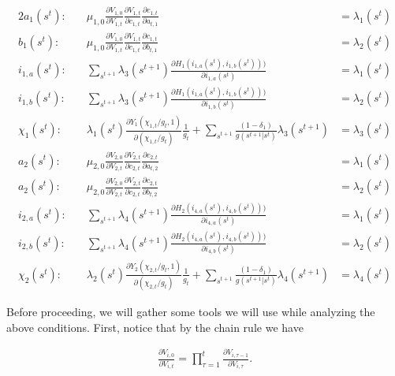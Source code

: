\documentclass[19pt]{article}
\newcommand{\fracpd}[2]{
  \ensuremath{\frac{\partial #1}{\partial #2}}
}
\begin{document}
\begin{alignat}{2}
  a_{1}(s^t)   : \quad & \mu_{1,0} \fracpd{V_{1,0}}{V_{1,t}}\fracpd{V_{1,t}}{c_{1,t}} \fracpd{c_{1,t}}{a_{t,1}} &= \lambda_{1}(s^t) \label{eq:foc_a1} \\
  b_{1}(s^t)   : \quad & \mu_{1,0} \fracpd{V_{1,0}}{V_{1,t}}\fracpd{V_{1,t}}{c_{1,t}} \fracpd{c_{1,t}}{b_{t,1}} &= \lambda_{2}(s^t) \label{eq:foc_b1} \\
  i_{1,a}(s^t) : \quad & \sum_{s^{t+1}} \lambda_3(s^{t+1}) \fracpd{H_1(i_{1,a}(s^t),i_{1,b}(s^t)))}{i_{1,a}(s^t)} &= \lambda_1(s^t) \label{eq:foc_i1a} \\
  i_{1,b}(s^t) : \quad & \sum_{s^{t+1}} \lambda_3(s^{t+1}) \fracpd{H_1(i_{1,a}(s^t),i_{1,b}(s^t)))}{i_{1,b}(s^t)} &= \lambda_2(s^t)\label{eq:foc_i1b} \\
  \chi_{1}(s^t): \quad & \lambda_1(s^t) \fracpd{Y_1(\chi_{1,t}/g_t, 1)}{(\chi_{1,t}/g_t)} \frac{1}{g_t} + \sum_{s^{t+1}} \frac{(1 - \delta_1)}{g(s^{t+1}|s^t)}\lambda_3(s^{t+1}) &= \lambda_3(s^t) \label{eq:foc_chi1} \\
  a_{2}(s^t)   : \quad & \mu_{2,0} \fracpd{V_{2,0}}{V_{2,t}}\fracpd{V_{2,t}}{c_{2,t}} \fracpd{c_{2,t}}{a_{t,2}} &= \lambda_{1}(s^t)\label{eq:foc_a2} \\
  a_{2}(s^t)   : \quad & \mu_{2,0} \fracpd{V_{2,0}}{V_{2,t}}\fracpd{V_{2,t}}{c_{2,t}} \fracpd{c_{2,t}}{b_{t,2}} &= \lambda_{2}(s^t)\label{eq:foc_b2} \\
  i_{2,a}(s^t) : \quad & \sum_{s^{t+1}} \lambda_4(s^{t+1}) \fracpd{H_2(i_{4,a}(s^t),i_{4,b}(s^t)))}{i_{4,a}(s^t)} &= \lambda_1(s^t) \label{eq:foc_i2a} \\
  i_{2,b}(s^t) : \quad & \sum_{s^{t+1}} \lambda_4(s^{t+1}) \fracpd{H_2(i_{4,a}(s^t),i_{4,b}(s^t)))}{i_{4,b}(s^t)} &= \lambda_2(s^t)\label{eq:foc_i2b} \\
  \chi_{2}(s^t): \quad & \lambda_2(s^t) \fracpd{Y_2(\chi_{2,t}/g_t, 1)}{(\chi_{2,t}/g_t)} \frac{1}{g_t} + \sum_{s^{t+1}} \frac{(1 - \delta_1)}{g(s^{t+1}|s^t)}\lambda_4(s^{t+1}) &= \lambda_4(s^t) \label{eq:foc_chi2}
\end{alignat}

Before proceeding, we will gather some tools we will use while analyzing the above conditions. First, notice that by the chain rule we have

\begin{align} \label{eq:chain_derivs}
  \fracpd{V_{i,0}}{V_{i,t}} = \prod_{\tau=1}^{t} \fracpd{V_{i,\tau-1}}{V_{i,\tau}}.
\end{align}
\end{document}
